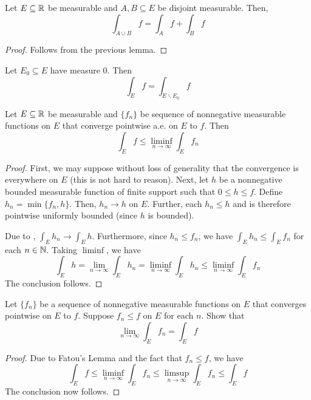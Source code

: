 \begin{theorem}
    Let $E\subseteq\mathbb{R}$ be measurable and $A,B\subseteq E$ be disjoint measurable. Then, 
    \begin{equation*}
        \int_{A\cup B}f = \int_A f + \int_B f
    \end{equation*}
\end{theorem}
\begin{proof}
    Follows from the previous lemma.
\end{proof}
\begin{corollary}
    Let $E_0\subseteq E$ have measure $0$. Then 
    \begin{equation*}
        \int_E f = \int_{E\backslash E_0} f
    \end{equation*}
\end{corollary}

\begin{lemma}
    Let $E\subseteq\mathbb{R}$ be measurable and $\{f_n\}$ be sequence of nonnegative measurable functions on $E$ that converge pointwise a.e. on $E$ to $f$. Then 
    \begin{equation*}
        \int_E f\le\liminf_{n\to\infty}\int_E f_n
    \end{equation*}
\end{lemma}
\begin{proof}
    First, we may suppose without loss of generality that the convergence is everywhere on $E$ (this is not hard to reason). Next, let $h$ be a nonnegative bounded measurable function of finite support such that $0\le h\le f$. Define $h_n = \min\{f_n, h\}$. Then, $h_n\to h$ on $E$. Further, each $h_n\le h$ and is therefore pointwise uniformly bounded (since $h$ is bounded). 

    Due to , $\int_E h_n\to\int_E h$. Furthermore, since $h_n\le f_n$, we have $ \int_E h_n\le\int_E f_n$ for each $n\in\mathbb{N}$. Taking $\liminf$, we have 
    \begin{equation*}
        \int_E h = \lim_{n\to\infty}\int_E h_n = \liminf_{n\to\infty}\int_E h_n\le\liminf_{n\to\infty}\int_E f_n
    \end{equation*}
    The conclusion follows.
\end{proof}

\begin{example}
    Let $\{f_n\}$ be a sequence of nonnegative measurable functions on $E$ that converges pointwise on $E$ to $f$. Suppose $f_n\le f$ on $E$ for each $n$. Show that 
    \begin{equation*}
        \lim_{n\to\infty}\int_E f_n = \int_E f
    \end{equation*}
\end{example}
\begin{proof}
    Due to Fatou's Lemma and the fact that $f_n\le f$, we have 
    \begin{equation*}
        \int_E f\le\liminf_{n\to\infty}\int_E f_n\le\limsup_{n\to\infty}\int_E f_n\le\int_E f
    \end{equation*}
    The conclusion now follows.
\end{proof}


